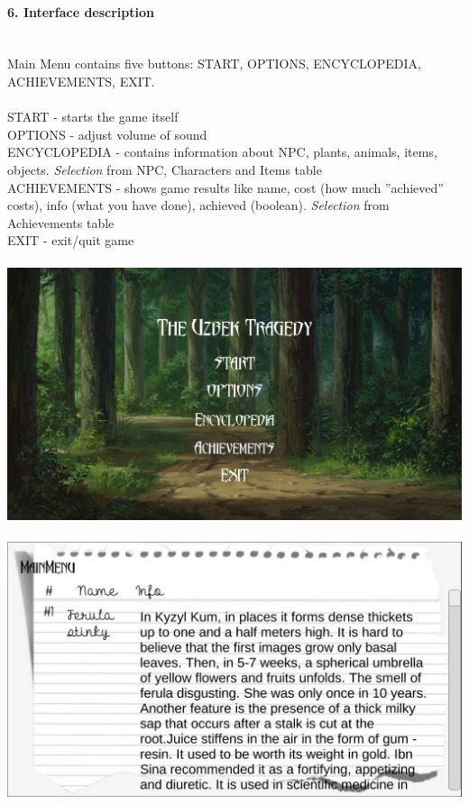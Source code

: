 \documentclass[12pt,a4paper]{article}
\newcommand{\ind}{\indent\indent}
\begin{document}
\paragraph{6. Interface description\\}
\ind\\
Main Menu contains five buttons: START, OPTIONS, ENCYCLOPEDIA, ACHIEVEMENTS, EXIT.\\
\ind\\START - starts the game itself\\
 OPTIONS - adjust volume of sound\\
ENCYCLOPEDIA - contains information about NPC, plants, animals, items, objects. \textit{Selection} from NPC, Characters and Items table   \\
ACHIEVEMENTS - shows game results like name, cost (how much ''achieved'' costs), info (what you have done), achieved (boolean). \textit{Selection} from Achievements table \\
EXIT - exit/quit game\\
\ind\\
\includegraphics[scale=0.35]{images/menu}
\ind\\ \ind\\
\includegraphics[scale=0.58]{images/en}
\end{document}
